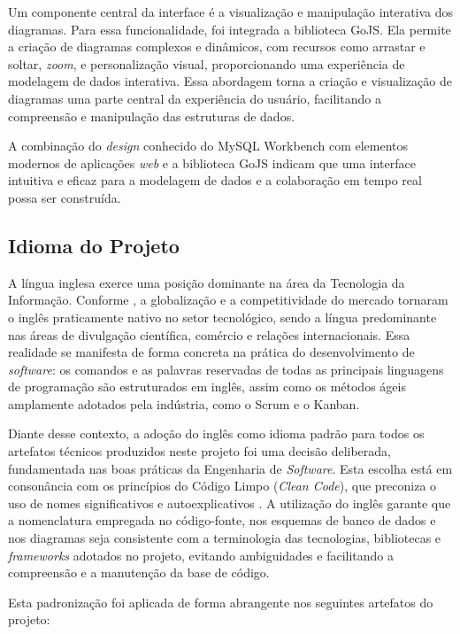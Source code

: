 Um componente central da interface é a visualização e manipulação interativa dos diagramas. Para essa funcionalidade, foi integrada a biblioteca GoJS. Ela permite a criação de diagramas complexos e dinâmicos, com recursos como arrastar e soltar, \textit{zoom}, e personalização visual, proporcionando uma experiência de modelagem de dados interativa. Essa abordagem torna a criação e visualização de diagramas uma parte central da experiência do usuário, facilitando a compreensão e manipulação das estruturas de dados.

A combinação do \textit{design} conhecido do MySQL Workbench com elementos modernos de aplicações \textit{web} e a biblioteca GoJS indicam que uma interface intuitiva e eficaz para a modelagem de dados e a colaboração em tempo real possa ser construída.



\subsection[Idioma do Projeto]{Idioma do Projeto}

A língua inglesa exerce uma posição dominante na área da Tecnologia da Informação. Conforme \cite{Alves2022}, a globalização e a competitividade do mercado tornaram o inglês praticamente nativo no setor tecnológico, sendo a língua predominante nas áreas de divulgação científica, comércio e relações internacionais. Essa realidade se manifesta de forma concreta na prática do desenvolvimento de \textit{software}: os comandos e as palavras reservadas de todas as principais linguagens de programação são estruturados em inglês, assim como os métodos ágeis amplamente adotados pela indústria, como o Scrum e o Kanban.

Diante desse contexto, a adoção do inglês como idioma padrão para todos os artefatos técnicos produzidos neste projeto foi uma decisão deliberada, fundamentada nas boas práticas da Engenharia de \textit{Software}. Esta escolha está em consonância com os princípios do Código Limpo (\textit{Clean Code}), que preconiza o uso de nomes significativos e autoexplicativos \cite{CleanCode2009}. A utilização do inglês garante que a nomenclatura empregada no código-fonte, nos esquemas de banco de dados e nos diagramas seja consistente com a terminologia das tecnologias, bibliotecas e \textit{frameworks} adotados no projeto, evitando ambiguidades e facilitando a compreensão e a manutenção da base de código.

Esta padronização foi aplicada de forma abrangente nos seguintes artefatos do projeto:

